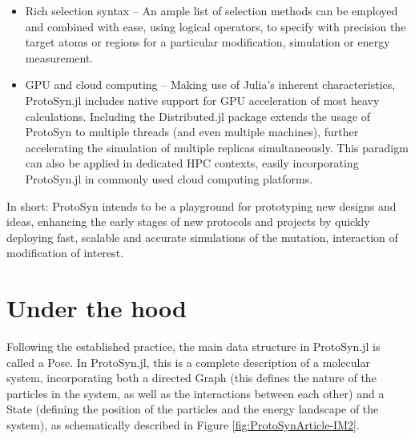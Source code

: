 \documentclass{juliacon}
\begin{document}
\begin{itemize}
\item Rich selection syntax – An ample list of selection methods can be employed and combined with ease, using logical operators, to specify with precision the target atoms or regions for a particular modification, simulation or energy measurement.\vspace{5mm}
\item GPU and cloud computing – Making use of Julia’s inherent characteristics, ProtoSyn.jl includes native support for GPU acceleration of most heavy calculations. Including the Distributed.jl package extends the usage of ProtoSyn to multiple threads (and even multiple machines), further accelerating the simulation of multiple replicas simultaneously. This paradigm can also be applied in dedicated HPC contexts, easily incorporating ProtoSyn.jl in commonly used cloud computing platforms.\vspace{5mm}
\end{itemize}\vspace{5mm}

In short: ProtoSyn intends to be a playground for prototyping new designs and ideas, enhancing the early stages of new protocols and projects by quickly deploying fast, scalable and accurate simulations of the mutation, interaction of modification of interest.

\section{Under the hood}

Following the established practice, the main data structure in ProtoSyn.jl is called a Pose. In ProtoSyn.jl, this is a complete description of a molecular system, incorporating both a directed Graph (this defines the nature of the particles in the system, as well as the interactions between each other) and a State (defining the position of the particles and the energy landscape of the system), as schematically described in Figure \ref{fig:ProtoSynArticle-IM2}.
\end{document}
